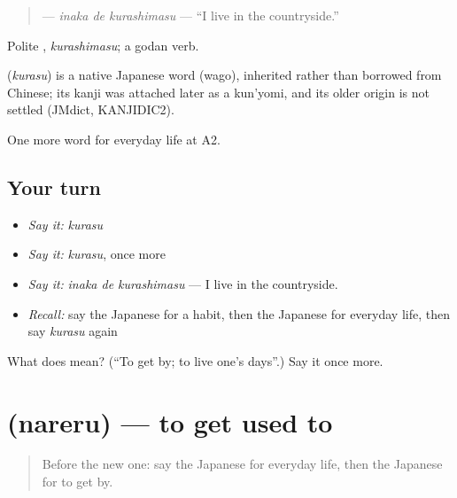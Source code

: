 \begin{quote}
\textbf{ } — \emph{inaka de kurashimasu} — \textquotedblleft{}I live in the countryside.\textquotedblright{}
\end{quote}

Polite \textbf{}, \emph{kurashimasu}; a godan verb.

\begin{cousinweb}
\textbf{} (\emph{kurasu}) is a native Japanese word (wago), inherited rather than borrowed from Chinese; its kanji was attached later as a kun'yomi, and its older origin is not settled (JMdict, KANJIDIC2).
\end{cousinweb}

\begin{grammarlens}[title={What you've built}]
One more word for everyday life at A2.
\end{grammarlens}

\subsection*{Your turn}
\begin{itemize}
\raggedright
  \item \emph{Say it:} \emph{kurasu}
  \item \emph{Say it:} \emph{kurasu}, once more
  \item \emph{Say it:} \emph{inaka de kurashimasu} — I live in the countryside.
  \item \emph{Recall:} say the Japanese for a habit, then the Japanese for everyday life, then say \emph{kurasu} again
\end{itemize}

\begin{tcolorbox}[breakable,colback=teal!4,colframe=teal!35!black,title={Before you move on}]
What does  mean? (\textquotedblleft{}To get by; to live one's days\textquotedblright{}.) Say it once more.
\end{tcolorbox}
\section[\texorpdfstring{\ja{なれる} (nareru)}{なれる (nareru)}]{ (nareru) — to get used to}

\label{lesson:JA-C154-nareru}



\begin{quote}
Before the new one: say the Japanese for everyday life, then the Japanese for to get by.
\end{quote}

